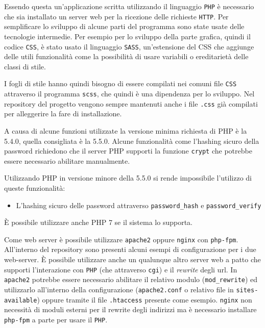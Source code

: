Essendo questa un'applicazione scritta utilizzando il linguaggio \texttt{PHP} è necessario che sia installato un server web per la ricezione delle richieste \texttt{HTTP}. Per semplificare lo sviluppo di alcune parti del programma sono state usate delle tecnologie intermedie. Per esempio per lo sviluppo della parte grafica, quindi il codice \texttt{CSS}, è stato usato il linguaggio \texttt{SASS}, un'estensione del CSS che aggiunge delle utili funzionalità come la possibilità di usare variabili o ereditarietà delle classi di stile.

I fogli di stile hanno quindi bisogno di essere compilati nei comuni file \texttt{CSS} attraverso il programma \texttt{scss}, che quindi è una dipendenza per lo sviluppo. Nel repository del progetto vengono sempre mantenuti anche i file \texttt{.css} già compilati per alleggerire la fare di installazione.

A causa di alcune funzioni utilizzate la versione minima richiesta di PHP è la 5.4.0, quella consigliata è la 5.5.0. Alcune funzionalità come l'hashing sicuro della password richiedono che il server PHP supporti la funzione \texttt{crypt} che potrebbe essere necessario abilitare manualmente.

Utilizzando PHP in versione minore della 5.5.0 si rende impossibile l'utilizzo di queste funzionalità:

\begin{itemize}
	\item L'hashing sicuro delle password attraverso \texttt{password\_hash} e \texttt{password\_verify}
\end{itemize}

È possibile utilizzare anche PHP 7 se il sistema lo supporta.

Come web server è possibile utilizzare \texttt{apache2} oppure \texttt{nginx} con \texttt{php-fpm}. All'interno del repository sono presenti alcuni esempi di configurazione per i due web-server. È possibile utilizzare anche un qualunque altro server web a patto che supporti l'interazione con \texttt{PHP} (che attraverso \texttt{cgi}) e il \emph{rewrite} degli url. In \texttt{apache2} potrebbe essere necessario abilitare il relativo modulo (\texttt{mod\_rewrite}) ed utilizzarlo all'interno della configurazione (\texttt{apache2.conf} o relativo file in \texttt{sites-available}) oppure tramite il file \texttt{.htaccess} presente come esempio. \texttt{nginx} non necessità di moduli esterni per il rewrite degli indirizzi ma è necessario installare \texttt{php-fpm} a parte per usare il \texttt{PHP}.

